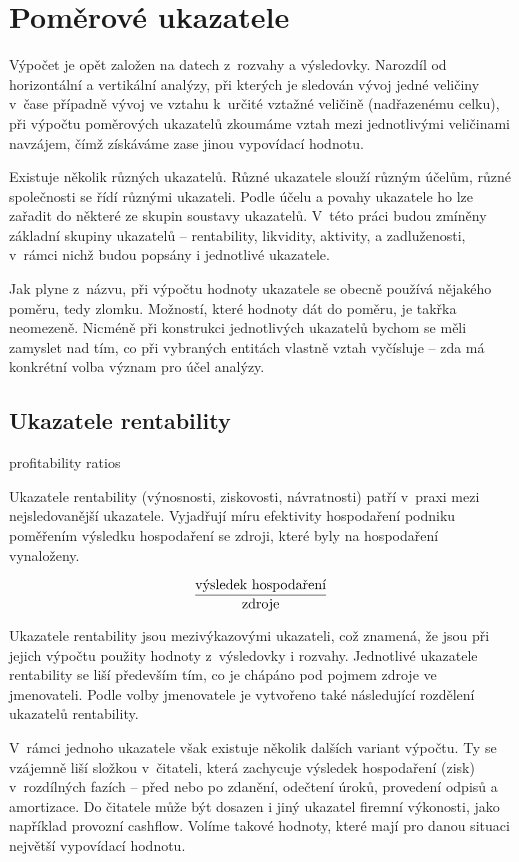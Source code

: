 \section{Poměrové ukazatele}
Výpočet je opět založen na datech z~rozvahy a výsledovky. Narozdíl od horizontální a vertikální analýzy, při kterých je sledován vývoj jedné veličiny v~čase případně vývoj ve vztahu k~určité vztažné veličině (nadřazenému celku), při výpočtu poměrových ukazatelů zkoumáme vztah mezi jednotlivými veličinami navzájem, čímž získáváme zase jinou vypovídací hodnotu.

Existuje několik různých ukazatelů. Různé ukazatele slouží různým účelům, různé společnosti se řídí různými ukazateli. Podle účelu a povahy ukazatele ho lze zařadit do některé ze skupin soustavy ukazatelů. V~této práci budou zmíněny základní skupiny ukazatelů -- rentability, likvidity, aktivity, a zadluženosti, v~rámci nichž budou popsány i jednotlivé ukazatele.

Jak plyne z~názvu, při výpočtu hodnoty ukazatele se obecně používá nějakého poměru, tedy zlomku. Možností, které hodnoty dát do poměru, je takřka neomezeně. Nicméně při konstrukci jednotlivých ukazatelů bychom se měli zamyslet nad tím, co při vybraných entitách vlastně vztah vyčísluje -- zda má konkrétní volba význam pro účel analýzy\cite{kisling}.

\subsection{Ukazatele rentability}
profitability ratios

Ukazatele rentability (výnosnosti, ziskovosti, návratnosti) patří v~praxi mezi nejsledovanější ukazatele. Vyjadřují míru efektivity hospodaření podniku poměřením výsledku hospodaření se zdroji, které byly na hospodaření vynaloženy.

$$\dfrac{\text{výsledek hospodaření}}{\text{zdroje}}$$

Ukazatele rentability jsou mezivýkazovými ukazateli, což znamená, že jsou při jejich výpočtu použity hodnoty z~výsledovky i rozvahy. Jednotlivé ukazatele rentability se liší především tím, co je chápáno pod pojmem zdroje ve jmenovateli\cite{mendelu}. Podle volby jmenovatele je vytvořeno také následující rozdělení ukazatelů rentability. 

V~rámci jednoho ukazatele však existuje několik dalších variant výpočtu. Ty se vzájemně liší složkou v~čitateli, která zachycuje výsledek hospodaření (zisk) v~rozdílných fazích -- před nebo po zdanění, odečtení úroků, provedení odpisů a amortizace. Do čitatele může být dosazen i jiný ukazatel firemní výkonosti, jako například provozní cashflow. Volíme takové hodnoty, které mají pro danou situaci největší vypovídací hodnotu.

